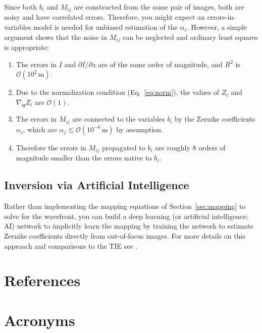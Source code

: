 \documentclass[TS,authoryear,toc]{lsstdoc}
\begin{document}
Since both $b_i$ and $M_{ij}$ are constructed from the same pair of images, both are noisy and have correlated errors.
Therefore, you might expect an errors-in-variables model is needed for unbiased estimation of the $\alpha_i$.
However, a simple argument shows that the noise in $M_{ij}$ can be neglected and ordinary least squares is appropriate:
\begin{enumerate}
    \item The errors in $I$ and $\partial I / \partial z$ are of the same order of magnitude, and $R^2$ is $\mathcal{O}(10^2 \,\text{m})$.
    \item Due to the normalization condition (Eq.~\ref{eq:norm}), the values of $Z_i$ and $\nabla_\mathbf{u} Z_i$ are $\mathcal{O}(1)$.
    \item The errors in $M_{ij}$ are connected to the variables $b_i$ by the Zernike coefficients $\alpha_j$, which are  $\alpha_j \lesssim \mathcal{O}(10^{-6} \,\text{m})$ by assumption.
    \item Therefore the errors in $M_{ij}$ propagated to $b_i$ are roughly 8 orders of magnitude smaller than the errors native to $b_i$.
    
\end{enumerate}



\subsection{Inversion via Artificial Intelligence}
\label{sec:ai}

Rather than implementing the mapping equations of Section~\ref{sec:mapping} to solve for the wavefront, you can build a deep learning (or artificial intelligence; AI) network to implicitly learn the mapping by training the network to estimate Zernike coefficients directly from out-of-focus images.
For more details on this approach and comparisons to the TIE see \citet{2024AJ....167...86C}.




\appendix
\section{References} \label{sec:bib}
\renewcommand{\refname}{} %


\section{Acronyms} \label{sec:acronyms}

\end{document}
